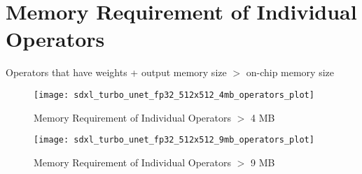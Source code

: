 \documentclass[12pt, letter, landscape]{article}
\begin{document}
\section{Memory Requirement of Individual Operators}
Operators that have weights + output memory size $>$ on-chip memory size
\begin{figure}[h]
\caption{Memory Requirement of Individual Operators $>$ 4 MB}
\centering
\texttt{[image: sdxl\_turbo\_unet\_fp32\_512x512\_4mb\_operators\_plot]}
\end{figure}

\clearpage

\begin{figure}[h]
\caption{Memory Requirement of Individual Operators $>$ 9 MB}
\centering
\texttt{[image: sdxl\_turbo\_unet\_fp32\_512x512\_9mb\_operators\_plot]}
\end{figure}

\clearpage
\end{document}
